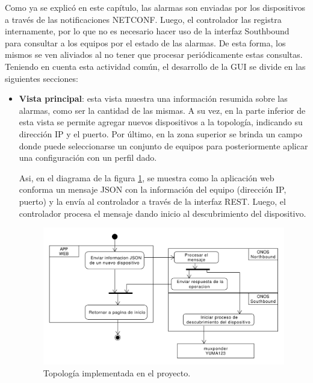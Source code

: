   Como ya se explicó en este capítulo, las alarmas son enviadas por los dispositivos a través de las notificaciones NETCONF. Luego, el controlador las registra internamente, por lo que no es necesario hacer uso de la interfaz Southbound para consultar a los equipos por el estado de las alarmas. De esta forma, los mismos se ven aliviados al no tener que procesar periódicamente estas consultas.
  \\

  Teniendo en cuenta esta actividad común, el desarrollo de la GUI se divide en las siguientes secciones:

  \begin{itemize}
	\item \textbf{Vista principal}: esta vista muestra una información resumida sobre las alarmas, como ser la cantidad de las mismas. A su vez, en la parte inferior de esta vista se permite agregar nuevos dispositivos a la topología, indicando su dirección IP y el puerto. Por último, en la zona superior se brinda un campo donde puede seleccionarse un conjunto de equipos para posteriormente aplicar una configuración con un perfil dado.
	
    Asi, en el diagrama de la figura \ref{fig:agregar_disp_web}, se muestra como la aplicación web conforma un mensaje JSON con la información del equipo (dirección IP, puerto) y la envía al controlador a través de la interfaz REST. Luego, el controlador procesa el mensaje dando inicio al descubrimiento del dispositivo.

    \begin{figure}[H]
        \centering
        \includegraphics[scale=0.45]{Figures/agregar_disp_web.pdf}
        \caption{Topología implementada en el proyecto.}
        \label{fig:agregar_disp_web}
      \end{figure}


\end{itemize}
